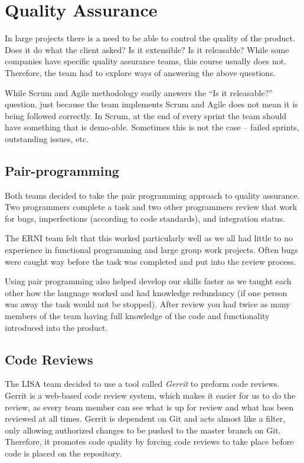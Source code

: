 \section {Quality Assurance}
In large projects there is a need to be able to control the quality of the product. Does it do what the client asked? Is it extensible? Is it releasable? While some companies have specific quality assurance teams, this  course usually does not. Therefore, the team had to explore ways of answering the above questions.

While Scrum and Agile methodology easily answers the ``Is it releasable?'' question, just because the team  implements Scrum and Agile does not mean it is being followed correctly. In Scrum, at the end of every sprint the team should have something that is demo-able. Sometimes this is not the case -- failed sprints, outstanding issues, etc.

\subsection{Pair-programming}

Both teams decided to take the pair programming approach to quality assurance. Two programmers complete a task and two other programmers review that work for bugs, imperfections (according to code standards), and integration status. 

The ERNI team felt that this worked particularly well as we all had little to no experience in functional programming and large group work projects. Often bugs were caught way before the task was completed and put into the review process. 

Using pair programming also helped develop our skills faster as we taught each other how the language worked and had knowledge redundancy (if one person was away the task would not be stopped). After review you had twice as many members of the team having full knowledge of the code and functionality introduced into the product.

\subsection{Code Reviews}

The LISA team decided to use a tool called \textit{Gerrit} to preform code reviews. Gerrit is a web-based code review system, which makes it easier for us to do the review, as every team member can see what is up for review and what has been reviewed at all times. Gerrit is dependent on Git and acts almost like a filter, only allowing authorized changes to be pushed to the master branch on Git. Therefore, it promotes code quality by forcing code reviews to take place before code is placed on the repository.

